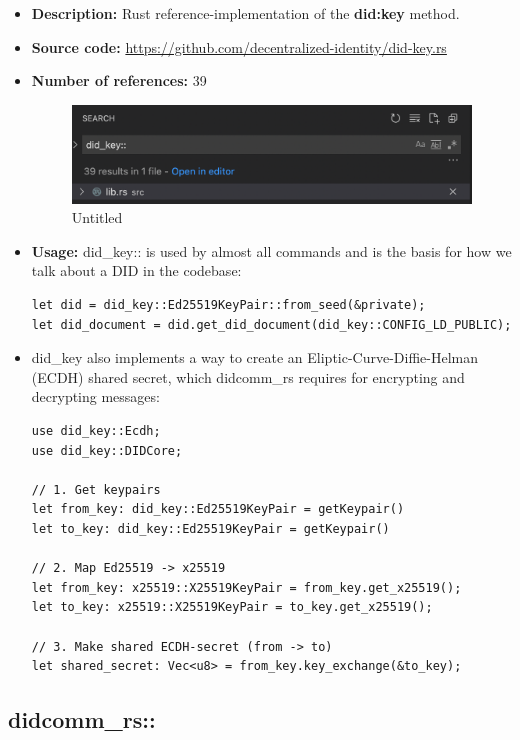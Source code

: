 \begin{itemize}
\item
  \textbf{Description:} Rust reference-implementation of the
  \textbf{did:key} method.
\item
  \textbf{Source code:}
  \url{https://github.com/decentralized-identity/did-key.rs}
\item
  \textbf{Number of references:} 39

  \begin{figure}
  \centering
  \includegraphics{Architecture 1442df162dbe45f4a423ba37d3e12363/Untitled 8.png}
  \caption{Untitled}
  \end{figure}
\item
  \textbf{Usage:} did\_key:: is used by almost all commands and is the
  basis for how we talk about a DID in the codebase:

\begin{lstlisting}
let did = did_key::Ed25519KeyPair::from_seed(&private);
let did_document = did.get_did_document(did_key::CONFIG_LD_PUBLIC);
\end{lstlisting}
\item
  did\_key also implements a way to create an
  Eliptic-Curve-Diffie-Helman (ECDH) shared secret, which didcomm\_rs
  requires for encrypting and decrypting messages:

\begin{lstlisting}
use did_key::Ecdh;
use did_key::DIDCore;

// 1. Get keypairs
let from_key: did_key::Ed25519KeyPair = getKeypair()
let to_key: did_key::Ed25519KeyPair = getKeypair()

// 2. Map Ed25519 -> x25519
let from_key: x25519::X25519KeyPair = from_key.get_x25519();
let to_key: x25519::X25519KeyPair = to_key.get_x25519();

// 3. Make shared ECDH-secret (from -> to)
let shared_secret: Vec<u8> = from_key.key_exchange(&to_key);
\end{lstlisting}
\end{itemize}

\hypertarget{didcomm_rs}{%
\subsection{didcomm\_rs::}\label{didcomm_rs}}

